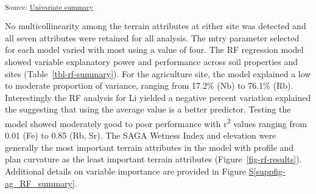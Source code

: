 \documentclass[
  number]{elsarticle}
\newcommand*\quartosuppfigref[1]{Figure \hyperref[#1]{S\ref{#1}}}
\begin{document}
\textsubscript{Source:
\href{https://alex-koiter.github.io/terrain-attributes/notebooks/univariate_analysis.qmd.html\#cell-tbl-correlation}{Univariate
summary}}

No multicollinearity among the terrain attributes at either site was
detected and all seven attributes were retained for all analysis. The
mtry parameter selected for each model varied with most using a value of
four. The RF regression model showed variable explanatory power and
performance across soil properties and sites
(Table~\ref{tbl-rf-summary}). For the agriculture site, the model
explained a low to moderate proportion of variance, ranging from 17.2\%
(Nb) to 76.1\% (Rb). Interestingly the RF analysis for Li yielded a
negative percent variation explained the suggesting that using the
average value is a better predictor. Testing the model showed moderately
good to poor performance with r\textsuperscript{2} values ranging from
0.01 (Fe) to 0.85 (Rb, Sr). The SAGA Wetness Index and elevation were
generally the most important terrain attributes in the model with
profile and plan curvature as the least important terrain attributes
(Figure~\ref{fig-rf-results}). Additional details on variable importance
are provided in \quartosuppfigref{suppfig-ag_RF_summary}.
\end{document}
